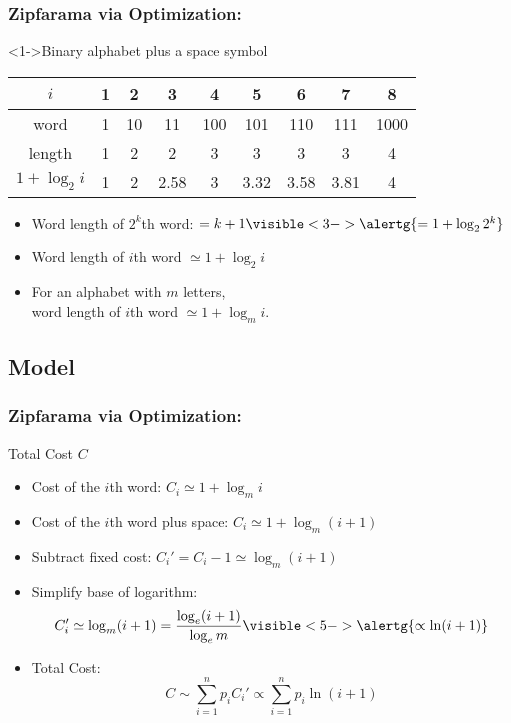 \begin{frame}
  \frametitle{Zipfarama via Optimization:}

  \begin{block}<1->{Binary alphabet plus a space symbol}
    \medskip
     {\small
    \begin{tabular}{|c|cccccccc|}
      \hline
      $i$ & 1 & 2 & 3 & 4 & 5 & 6 & 7 & 8 \\
      \hline
      word & 1 & 10 & 11 & 100 & 101 & 110 & 111 & 1000 \\
      \hline
      length & 1 & 2 & 2 & 3 & 3 & 3 & 3 & 4 \\
      \hline
      $1+\log_2 i$ & 1 & 2 & 2.58 & 3 & 3.32 & 3.58 & 3.81 & 4 \\
      \hline
    \end{tabular}
    }
  \end{block}

  \begin{block}{}
    \begin{itemize}
    \item<2-> Word length of $2^k$th word:
      $= k+1 \visible<3->{\alertg{= 1+\log_2 2^k }}$
    \item<4-> Word length of $i$th word $\simeq 1 + \log_2 i$
    \item<5-> For an alphabet with $m$ letters,\\
      word length of $i$th word $\simeq 1 + \log_m i$.
    \end{itemize}
  \end{block}

\end{frame}

\subsection{Model}

\begin{frame}
  \frametitle{Zipfarama via Optimization:}

  \begin{block}{Total Cost $C$}
    \begin{itemize}
    \item<1->
      Cost of the $i$th word:
      $
      C_i \simeq 1 + \log_{m} i
      $
    \item<2->
      Cost of the $i$th word plus space:
      $
      C_i \simeq 1 + \log_{m} (i + 1)
      $
    \item<3->
      Subtract fixed cost:
      $ C_i' = C_i - 1 \simeq \log_{m} (i + 1) $
    \item<4->
      Simplify base of logarithm:
      $$ 
      C_i' \simeq \log_{m} (i+1) = \frac{\log_e (i+1)}{\log_e m}
      \visible<5->{\alertg{\propto \ln (i+1)}}
      $$
    \item<6->
      Total Cost:
      $$
      C \sim \sum_{i=1}^n p_i C_i' \propto \sum_{i=1}^n p_i \ln (i+1)
      $$
    \end{itemize}
  \end{block}

\end{frame}


